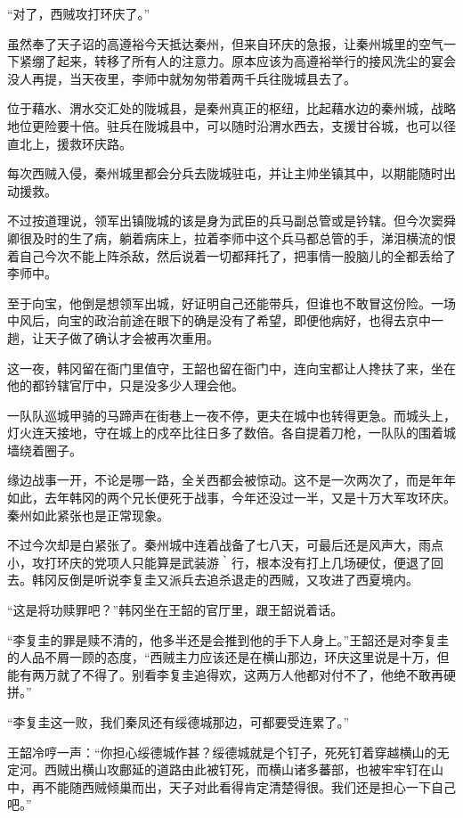 “对了，西贼攻打环庆了。”

虽然奉了天子诏的高遵裕今天抵达秦州，但来自环庆的急报，让秦州城里的空气一下紧绷了起来，转移了所有人的注意力。原本应该为高遵裕举行的接风洗尘的宴会没人再提，当天夜里，李师中就匆匆带着两千兵往陇城县去了。

位于藉水、渭水交汇处的陇城县，是秦州真正的枢纽，比起藉水边的秦州城，战略地位更险要十倍。驻兵在陇城县中，可以随时沿渭水西去，支援甘谷城，也可以径直北上，援救环庆路。

每次西贼入侵，秦州城里都会分兵去陇城驻屯，并让主帅坐镇其中，以期能随时出动援救。

不过按道理说，领军出镇陇城的该是身为武臣的兵马副总管或是钤辖。但今次窦舜卿很及时的生了病，躺着病床上，拉着李师中这个兵马都总管的手，涕泪横流的恨着自己今次不能上阵杀敌，然后说着一切都拜托了，把事情一股脑儿的全都丢给了李师中。

至于向宝，他倒是想领军出城，好证明自己还能带兵，但谁也不敢冒这份险。一场中风后，向宝的政治前途在眼下的确是没有了希望，即便他病好，也得去京中一趟，让天子做了确认才会被再次重用。

这一夜，韩冈留在衙门里值守，王韶也留在衙门中，连向宝都让人搀扶了来，坐在他的都钤辖官厅中，只是没多少人理会他。

一队队巡城甲骑的马蹄声在街巷上一夜不停，更夫在城中也转得更急。而城头上，灯火连天接地，守在城上的戍卒比往日多了数倍。各自提着刀枪，一队队的围着城墙绕着圈子。

缘边战事一开，不论是哪一路，全关西都会被惊动。这不是一次两次了，而是年年如此，去年韩冈的两个兄长便死于战事，今年还没过一半，又是十万大军攻环庆。秦州如此紧张也是正常现象。

不过今次却是白紧张了。秦州城中连着战备了七八天，可最后还是风声大，雨点小，攻打环庆的党项人只能算是武装游｀行，根本没有打上几场硬仗，便退了回去。韩冈反倒是听说李复圭又派兵去追杀退走的西贼，又攻进了西夏境内。

“这是将功赎罪吧？”韩冈坐在王韶的官厅里，跟王韶说着话。

“李复圭的罪是赎不清的，他多半还是会推到他的手下人身上。”王韶还是对李复圭的人品不屑一顾的态度，“西贼主力应该还是在横山那边，环庆这里说是十万，但能有两万就了不得了。别看李复圭追得欢，这两万人他都对付不了，他绝不敢再硬拼。”

“李复圭这一败，我们秦凤还有绥德城那边，可都要受连累了。”

王韶冷哼一声：“你担心绥德城作甚？绥德城就是个钉子，死死钉着穿越横山的无定河。西贼出横山攻鄜延的道路由此被钉死，而横山诸多蕃部，也被牢牢钉在山中，再不能随西贼倾巢而出，天子对此看得肯定清楚得很。我们还是担心一下自己吧。”

